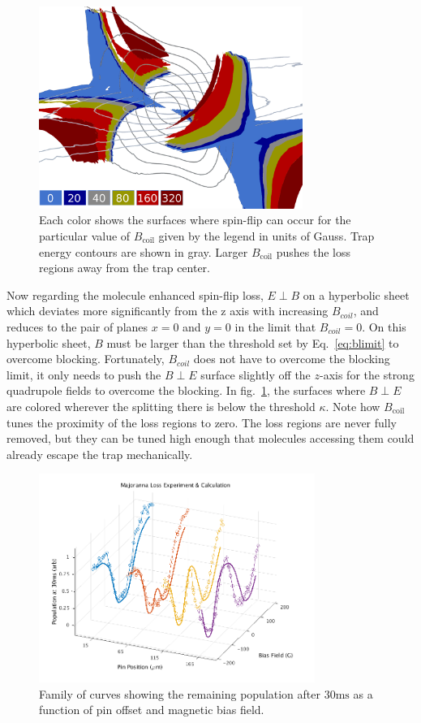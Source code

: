 \documentclass[%
 reprint,
 amsmath,amssymb,
 aps,
prl,
]{revtex4-1}
\begin{document}
\begin{figure}
\includegraphics[width=86mm]{Loss_Surface_Chunks_recolored_legend.png}%
\caption{
Each color shows the surfaces where spin-flip can occur for the particular value of $B_\text{coil}$ given by the legend in units of Gauss. Trap energy contours are shown in gray. Larger $B_\text{coil}$ pushes the loss regions away from the trap center.
\label{fig:LSurfs}}
\end{figure}

Now regarding the molecule enhanced spin-flip loss, $E\!\perp\! B$ on a hyperbolic sheet which deviates more significantly from the z axis with increasing $B_{coil}$, and reduces to the pair of planes $x=0$ and $y=0$ in the limit that $B_{coil} = 0$. On this hyperbolic sheet, $B$ must be larger than the threshold set by Eq.~\ref{eq:blimit} to overcome blocking. Fortunately, $B_{coil}$ does not have to overcome the blocking limit, it only needs to push the $B\!\perp\! E$ surface slightly off the $z$-axis for the strong  quadrupole fields to overcome the blocking. In fig.~\ref{fig:LSurfs}, the surfaces where $B\!\perp\! E$ are colored wherever the splitting there is below the threshold $\kappa$. Note how $B_\text{coil}$ tunes the proximity of the loss regions to zero. The loss regions are never fully removed, but they can be tuned high enough that molecules accessing them could already escape the trap mechanically.

\begin{figure}
\includegraphics[width=90mm]{V-to-W-plot-3D-dave.png}%
\caption{
Family of curves showing the remaining population after $30 \text{ms}$ as a function of pin offset and magnetic bias field.
\label{fig:WVplot}}
\end{figure}
\end{document}
